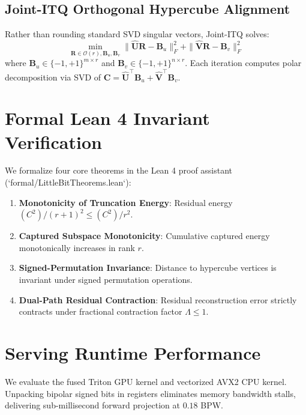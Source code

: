\documentclass[11pt,a4paper]{article}
\begin{document}
\subsection{Joint-ITQ Orthogonal Hypercube Alignment}
Rather than rounding standard SVD singular vectors, Joint-ITQ solves:
\begin{equation}
\min_{\mathbf{R} \in \mathcal{O}(r), \mathbf{B}_u, \mathbf{B}_v} \|\hat{\mathbf{U}} \mathbf{R} - \mathbf{B}_u\|_F^2 + \|\hat{\mathbf{V}} \mathbf{R} - \mathbf{B}_v\|_F^2
\end{equation}
where $\mathbf{B}_u \in \{-1, +1\}^{m \times r}$ and $\mathbf{B}_v \in \{-1, +1\}^{n \times r}$. Each iteration computes polar decomposition via SVD of $\mathbf{C} = \hat{\mathbf{U}}^\top \mathbf{B}_u + \hat{\mathbf{V}}^\top \mathbf{B}_v$.

\section{Formal Lean 4 Invariant Verification}
We formalize four core theorems in the Lean 4 proof assistant (`formal/LittleBitTheorems.lean`):
\begin{enumerate}
    \item \textbf{Monotonicity of Truncation Energy}: Residual energy $(C^2) / (r+1)^2 \le (C^2) / r^2$.
    \item \textbf{Captured Subspace Monotonicity}: Cumulative captured energy monotonically increases in rank $r$.
    \item \textbf{Signed-Permutation Invariance}: Distance to hypercube vertices is invariant under signed permutation operations.
    \item \textbf{Dual-Path Residual Contraction}: Residual reconstruction error strictly contracts under fractional contraction factor $\Lambda \le 1$.
\end{enumerate}

\section{Serving Runtime Performance}
We evaluate the fused Triton GPU kernel and vectorized AVX2 CPU kernel. Unpacking bipolar signed bits in registers eliminates memory bandwidth stalls, delivering sub-millisecond forward projection at $0.18$ BPW.
\end{document}
